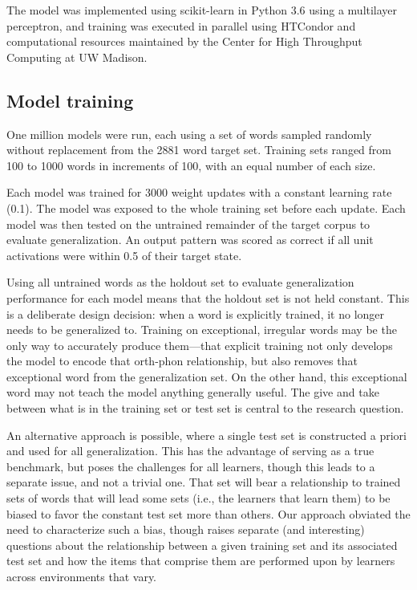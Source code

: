 \documentclass[10pt,letterpaper]{article}
\begin{document}
The model was implemented using scikit-learn in Python 3.6 using a multilayer perceptron, and training was executed in parallel using HTCondor \cite{Thain2005} and computational resources maintained by the Center for High Throughput Computing at UW Madison.  

\subsection{Model training}
One million models were run, each using a set of words sampled randomly without replacement from the 2881 word target set. Training sets ranged from 100 to 1000 words in increments of 100, with an equal number of each size.

Each model was trained for 3000 weight updates with a constant learning rate (0.1). The model was exposed to the whole training set before each update. Each model was then tested on the untrained remainder of the target corpus to evaluate generalization. An output pattern was scored as correct if all unit activations were within 0.5 of their target state.

Using all untrained words as the holdout set to evaluate generalization performance for each model means that the holdout set is not held constant.
This is a deliberate design decision: when a word is explicitly trained, it no longer needs to be generalized to.
Training on exceptional, irregular words may be the only way to accurately produce them---that explicit training not only develops the model to encode that orth-phon relationship, but also removes that exceptional word from the generalization set.
On the other hand, this exceptional word may not teach the model anything generally useful.
The give and take between what is in the training set or test set is central to the research question.

An alternative approach is possible, where a single test set is constructed a priori and used for all generalization.
This has the advantage of serving as a true benchmark, but poses the challenges
for all learners, though this leads to a separate issue, and not a trivial one. That set will bear a relationship to trained sets of words that will lead some sets (i.e., the learners that learn them) to be biased to favor the constant test set more than others. Our approach obviated the need to characterize such a bias, though raises separate (and interesting) questions about the relationship between a given training set and its associated test set and how the items that comprise them are performed upon by learners across environments that vary.
\end{document}
